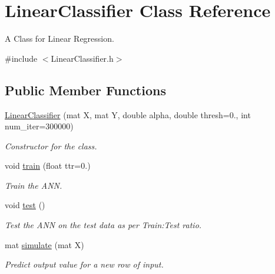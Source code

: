 \hypertarget{classLinearClassifier}{}\section{Linear\+Classifier Class Reference}
\label{classLinearClassifier}


A Class for Linear Regression.  




{\ttfamily \#include $<$Linear\+Classifier.\+h$>$}

\subsection*{Public Member Functions}
\begin{DoxyCompactItemize}
\item 
\hyperlink{classLinearClassifier_a840feb0a19e17e7210796e5e8cd68d2b}{Linear\+Classifier} (mat X, mat Y, double alpha, double thresh=0., int num\+\_\+iter=300000)
\begin{DoxyCompactList}\small\item\em Constructor for the class. \end{DoxyCompactList}\item 
void \hyperlink{classLinearClassifier_a646b303b1eb86af2fb94a18b18ea8334}{train} (float ttr=0.)
\begin{DoxyCompactList}\small\item\em Train the A\+NN. \end{DoxyCompactList}\item 
\mbox{\label{classLinearClassifier_a530a87fc184081f522d0c4ffc28df0b0}} 
void \hyperlink{classLinearClassifier_a530a87fc184081f522d0c4ffc28df0b0}{test} ()
\begin{DoxyCompactList}\small\item\em Test the A\+NN on the test data as per Train\+:Test ratio. \end{DoxyCompactList}\item 
\mbox{\label{classLinearClassifier_a33cbc3e353e3e0a7412990ad1740264d}} 
mat \hyperlink{classLinearClassifier_a33cbc3e353e3e0a7412990ad1740264d}{simulate} (mat X)
\begin{DoxyCompactList}\small\item\em Predict output value for a new row of input. \end{DoxyCompactList}\item 

\end{DoxyCompactItemize}
